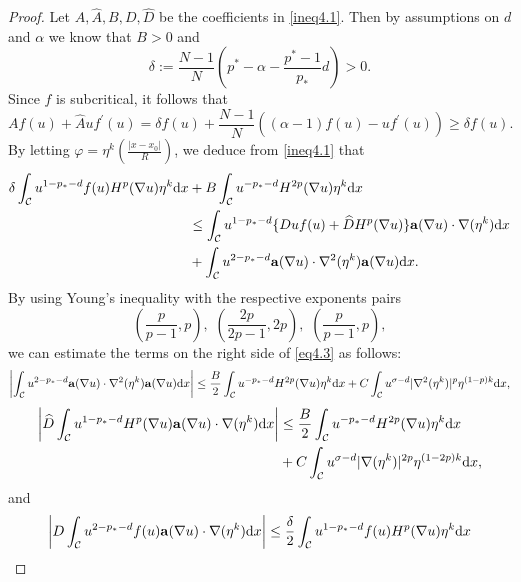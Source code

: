 \documentclass[12pt]{amsart}
\theoremstyle{definition}
\theoremstyle{remark}
\theoremstyle{conclusion}
\theoremstyle{conjecture}
\numberwithin{equation}{section}
\begin{document}
\begin{proof}
Let $A,\widehat{A}, B,D,\widehat{D}$ be the coefficients in \eqref{ineq4.1}. Then by assumptions on $d$ and $\alpha$ we know that $B>0$ and
$$\delta:=\frac{N-1}{N}\left(p^*-\alpha-\frac{p^*-1}{p_*}d\right)>0.$$
Since $f$ is subcritical, it follows that
$$Af(u)+\widehat{A}uf^{\prime}(u)=\delta f(u)+\frac{N-1}{N}\left((\alpha-1)f(u)-uf^{\prime}(u)\right)\geq\delta f(u).$$
By letting $\varphi=\eta^k(\frac{|x-x_0|}{R})$, we deduce from \eqref{ineq4.1} that
\begin{equation}\label{eq4.3}
  \begin{aligned}
  \delta\int_{\mathcal{C}}u^{1-p_*-d}f(u)H^p(\nabla u)\eta^k\mathrm{d}x&+B\int_{\mathcal{C}}u^{-p_*-d}H^{2p}(\nabla u)\eta^k\mathrm{d}x \\
  &\leq \int_{\mathcal{C}}u^{1-p_*-d}\{Duf(u)+\widehat{D}H^p(\nabla u)\}{\bf{a}}(\nabla u)\cdot\nabla(\eta^k)\mathrm{d}x\\
  &+\int_{\mathcal{C}}u^{2-p_*-d}{\bf{a}}(\nabla u)\cdot\nabla^2(\eta^k){\bf{a}}(\nabla u)\mathrm{d}x.
  \end{aligned}
\end{equation}
By using Young's inequality with the respective exponents pairs
$$\left(\frac{p}{p-1},p\right),\,\,\left(\frac{2p}{2p-1},2p\right),\,\,\left(\frac{p}{p-1},p\right),$$
we can estimate the terms on the right side of \eqref{eq4.3} as follows:
$$\left\lvert \int_{\mathcal{C}}u^{2-p_*-d}{\bf{a}}(\nabla u)\cdot\nabla^2(\eta^k){\bf{a}}(\nabla u)\mathrm{d}x\right\rvert \leq \frac{B}{2}\int_{\mathcal{C}}u^{-p_*-d}H^{2p}(\nabla u)\eta^k\mathrm{d}x+C\int_{\mathcal{C}}u^{\sigma-d}|\nabla^2(\eta^k)|^p\eta^{(1-p)k}\mathrm{d}x,$$
\begin{equation*}
  \begin{aligned}
 \left\lvert\widehat{D} \int_{\mathcal{C}}u^{1-p_*-d}H^p(\nabla u){\bf{a}}(\nabla u)\cdot\nabla(\eta^k)\mathrm{d}x\right\rvert &\leq   \frac{B}{2}\int_{\mathcal{C}}u^{-p_*-d}H^{2p}(\nabla u)\eta^k\mathrm{d}x\\
 &+ C\int_{\mathcal{C}}u^{\sigma-d}|\nabla(\eta^k)|^{2p}\eta^{(1-2p)k}\mathrm{d}x,
  \end{aligned}
\end{equation*}
and
\begin{equation*}
  \begin{aligned}
 \left\lvert D \int_{\mathcal{C}}u^{2-p_*-d}f(u){\bf{a}}(\nabla u)\cdot\nabla(\eta^k)\mathrm{d}x\right\rvert &\leq   \frac{\delta}{2}\int_{\mathcal{C}}u^{1-p_*-d}f(u)H^{p}(\nabla u)\eta^k\mathrm{d}x\\

\end{aligned}
\end{equation*}
\end{proof}
\end{document}
